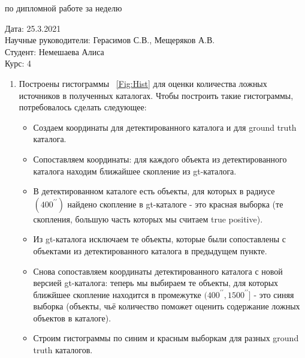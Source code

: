 \documentclass{article}
\begin{document}
\begin{center}{ по дипломной работе за неделю\\}\end{center}
Дата: 25.3.2021\\
Научные руководители: Герасимов С.В., Мещеряков А.В.\\
Студент: Немешаева Алиса\\
Курс: 4\\

\renewcommand{\labelitemi}{$\blacksquare$}
\renewcommand\labelitemii{$\square$}
\begin{enumerate}
    \item Построены гистограммы ~\ref{Fig:Hist}{} для оценки количества ложных источников в 
        полученных каталогах. 
        Чтобы построить такие гистограммы, потребовалось сделать следующее:\\
        \begin{itemize}
            \item Создаем координаты для детектированного каталога и для ground truth каталога.\\
            \item Сопоставляем координаты: для каждого объекта из детектированного каталога находим
                ближайшее скопление из gt-каталога.\\
            \item В детектированном каталоге есть объекты, для которых в радиусе  
                $(400^{\prime \prime})$ найдено скопление в gt-каталоге - это красная выборка (те
                скопления, большую часть которых мы считаем true positive).\\
            \item Из gt-каталога исключаем те объекты, которые были сопоставлены с объектами из
                детектированного каталога в предыдущем пункте.\\
            \item Снова сопоставляем координаты детектированного каталога с новой версией 
                gt-каталога: теперь мы выбираем те объекты, для которых ближйшее скопление 
                находится в промежутке $(400^{\prime \prime}, 1500^{\prime \prime}]$ - это синяя 
                выборка (объекты, чьё количество поможет оценить содержание ложных объектов в 
                каталоге).\\
            \item Строим гистограммы по синим и красным выборкам для разных ground truth каталогов.\\

\end{itemize}
\end{enumerate}
\end{document}
